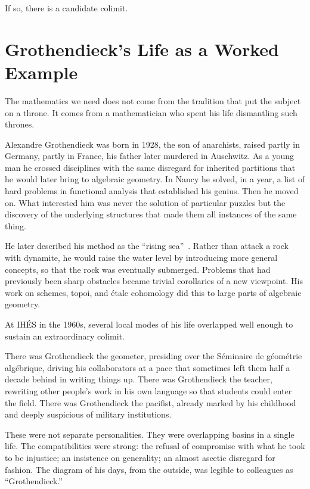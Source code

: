 \documentclass[12pt,a4paper]{article}
\begin{document}
If so, there is a candidate colimit.

\section{Grothendieck's Life as a Worked Example}

The mathematics we need does not come from the tradition that put the subject on a throne. It comes from a mathematician who spent his life dismantling such thrones.

Alexandre Grothendieck was born in 1928, the son of anarchists, raised partly in Germany, partly in France, his father later murdered in Auschwitz. As a young man he crossed disciplines with the same disregard for inherited partitions that he would later bring to algebraic geometry. In Nancy he solved, in a year, a list of hard problems in functional analysis that established his genius. Then he moved on. What interested him was never the solution of particular puzzles but the discovery of the underlying structures that made them all instances of the same thing.

He later described his method as the ``rising sea''~\cite{mclarty}. Rather than attack a rock with dynamite, he would raise the water level by introducing more general concepts, so that the rock was eventually submerged. Problems that had previously been sharp obstacles became trivial corollaries of a new viewpoint. His work on schemes, topoi, and \'etale cohomology did this to large parts of algebraic geometry.

At IH\'ES in the 1960s, several local modes of his life overlapped well enough to sustain an extraordinary colimit.

There was Grothendieck the geometer, presiding over the S\'eminaire de g\'eom\'etrie alg\'ebrique, driving his collaborators at a pace that sometimes left them half a decade behind in writing things up. There was Grothendieck the teacher, rewriting other people's work in his own language so that students could enter the field. There was Grothendieck the pacifist, already marked by his childhood and deeply suspicious of military institutions.

These were not separate personalities. They were overlapping basins in a single life. The compatibilities were strong: the refusal of compromise with what he took to be injustice; an insistence on generality; an almost ascetic disregard for fashion. The diagram of his days, from the outside, was legible to colleagues as ``Grothendieck.''
\end{document}
